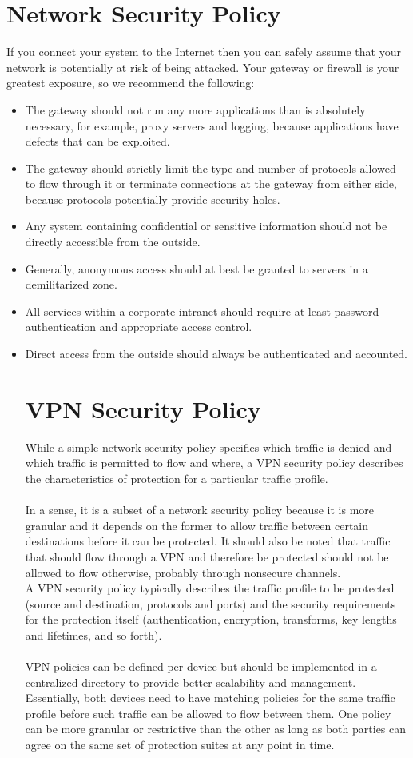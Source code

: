 \documentclass[10pt,a4paper]{article}
\begin{document}
\section{Network Security Policy}
If you connect your system to the Internet then you can safely assume that your
network is potentially at risk of being attacked. Your gateway or firewall is your
greatest exposure, so we recommend the following:
\\
\begin{itemize}
\item The gateway should not run any more applications than is absolutely
necessary, for example, proxy servers and logging, because applications have
defects that can be exploited.
\item The gateway should strictly limit the type and number of protocols allowed to
flow through it or terminate connections at the gateway from either side,
because protocols potentially provide security holes.
\item Any system containing confidential or sensitive information should not be
directly accessible from the outside.
\item Generally, anonymous access should at best be granted to servers in a
demilitarized zone.
\item All services within a corporate intranet should require at least password
authentication and appropriate access control.
\item Direct access from the outside should always be authenticated and
accounted.
\begin{itemize}
\section{VPN Security Policy}
While a simple network security policy specifies which traffic is denied and which
traffic is permitted to flow and where, a VPN security policy describes the
characteristics of protection for a particular traffic profile. 
\\
\\
In a sense, it is a subset
of a network security policy because it is more granular and it depends on the
former to allow traffic between certain destinations before it can be protected. It
should also be noted that traffic that should flow through a VPN and therefore be
protected should not be allowed to flow otherwise, probably through nonsecure
channels.
\\
A VPN security policy typically describes the traffic profile to be protected (source
and destination, protocols and ports) and the security requirements for the
protection itself (authentication, encryption, transforms, key lengths and lifetimes,
and so forth). 
\\
\\
VPN policies can be defined per device but should be implemented
in a centralized directory to provide better scalability and management.
Essentially, both devices need to have matching policies for the same traffic
profile before such traffic can be allowed to flow between them. One policy can
be more granular or restrictive than the other as long as both parties can agree
on the same set of protection suites at any point in time.


\end{itemize}
\end{itemize}
\end{document}
